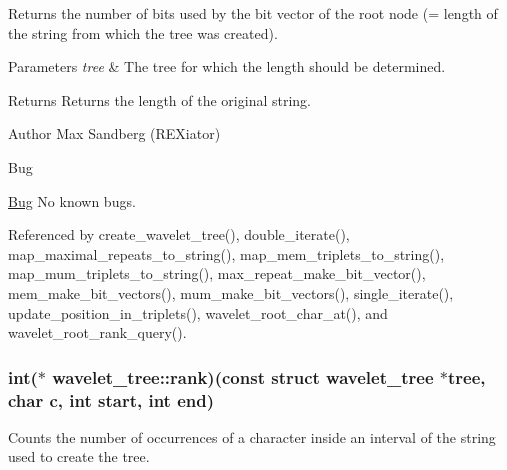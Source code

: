 \-Returns the number of bits used by the bit vector of the root node (= length of the string from which the tree was created). 


\begin{DoxyParams}{\-Parameters}
{\em tree} & \-The tree for which the length should be determined. \\
\hline
\end{DoxyParams}
\begin{DoxyReturn}{\-Returns}
\-Returns the length of the original string. 
\end{DoxyReturn}
\begin{DoxyAuthor}{\-Author}
\-Max \-Sandberg (\-R\-E\-Xiator) 
\end{DoxyAuthor}
\begin{DoxyRefDesc}{\-Bug}
\item[\hyperlink{bug__bug000158}{\-Bug}]\-No known bugs. \end{DoxyRefDesc}


\-Referenced by create\-\_\-wavelet\-\_\-tree(), double\-\_\-iterate(), map\-\_\-maximal\-\_\-repeats\-\_\-to\-\_\-string(), map\-\_\-mem\-\_\-triplets\-\_\-to\-\_\-string(), map\-\_\-mum\-\_\-triplets\-\_\-to\-\_\-string(), max\-\_\-repeat\-\_\-make\-\_\-bit\-\_\-vector(), mem\-\_\-make\-\_\-bit\-\_\-vectors(), mum\-\_\-make\-\_\-bit\-\_\-vectors(), single\-\_\-iterate(), update\-\_\-position\-\_\-in\-\_\-triplets(), wavelet\-\_\-root\-\_\-char\-\_\-at(), and wavelet\-\_\-root\-\_\-rank\-\_\-query().

\hypertarget{structwavelet__tree_ad578b3f750505527bcb0e9778cb26030}{
\subsubsection[{rank}]{\setlength{\rightskip}{0pt plus 5cm}int($\ast$ {\bf wavelet\-\_\-tree\-::rank})(const struct {\bf wavelet\-\_\-tree} $\ast$tree, char c, int start, int end)}}\label{structwavelet__tree_ad578b3f750505527bcb0e9778cb26030}


\-Counts the number of occurrences of a character inside an interval of the string used to create the tree. 


